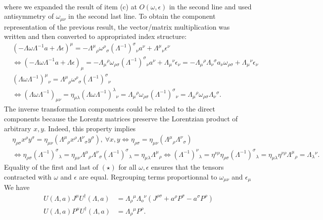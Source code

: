 \documentclass[10pt, a4paper]{article}
\begin{document}
\begin{enumerate}
\begin{align*}
  \end{align*}
  where we expanded the result of item (c) at $O(\omega, \epsilon)$ in the second line and used antisymmetry of $\omega_{\mu\nu}$ in the second last line. To obtain the component representation of the previous result, the vector/matrix multiplication was written and then converted to appropriated index structure:
  \begin{align*}
    &(-\Lambda\omega \Lambda^{-1} a + \Lambda \epsilon)^\mu = -\Lambda^{\mu}{}_{\rho} \omega^{\rho}{}_{\sigma}  (\Lambda^{-1})^{\sigma}{}_{\nu} a^{\nu} + \Lambda^{\mu}{}_{\nu} \epsilon^{\nu}\\ &\iff (-\Lambda\omega \Lambda^{-1} a + \Lambda \epsilon)_\mu = -\Lambda_{\mu}{}^{\rho} \omega_{\rho\sigma}  (\Lambda^{-1})^{\sigma}{}_{\nu} a^{\nu} + \Lambda_{\mu}{}^{\nu} \epsilon_{\nu} =  -\Lambda_{\mu}{}^{\rho} \Lambda_{\nu}{}^{\sigma} a_{\nu} \omega_{\rho\sigma} + \Lambda_{\mu}{}^{\nu} \epsilon_{\nu}\\
    &(\Lambda \omega \Lambda^{-1})^{\mu}{}_{\nu} = \Lambda^{\mu}{}_{\rho}  \omega^{\rho}{}_{\sigma}  (\Lambda^{-1})^{\sigma}{}_{\nu}\\
    &\iff (\Lambda \omega \Lambda^{-1})_{\mu\nu} = \eta_{\mu\lambda} (\Lambda \omega \Lambda^{-1})^{\lambda}{}_{\nu} = \Lambda_{\mu}{}^{\rho}  \omega_{\rho\sigma}  (\Lambda^{-1})^{\sigma}{}_{\nu} = \Lambda_{\mu}{}^{\rho}  \omega_{\rho\sigma} \Lambda_{\nu}{}^{\sigma}.
  \end{align*}
  The inverse transformation components could be related to the direct components because the Lorentz matrices preserve the Lorentzian product of arbitrary $x, y$. Indeed, this property implies 
  \begin{align*}
    &\eta_{\rho \sigma} x^{\rho} y^{\sigma}= \eta_{\mu \nu}(\Lambda^{\mu}{}_{\rho} x^\rho  \Lambda^{\nu}{}_{\sigma} y^{\sigma}), \ \forall x, y \iff \eta_{\rho \sigma}= \eta_{\mu \nu}(\Lambda^{\mu}{}_{\rho} \Lambda^{\nu}{}_{\sigma}) \\
    &\iff \eta_{\rho \sigma} (\Lambda^{-1})^{\sigma}{}_{\lambda}= \eta_{\mu \nu} \Lambda^{\mu}{}_{\rho} \Lambda^{\nu}{}_{\sigma} (\Lambda^{-1})^{\sigma}{}_{\lambda} = \eta_{\mu \lambda} \Lambda^{\mu}{}_{\rho}
    \iff (\Lambda^{-1})^{\nu}{}_{\lambda} = \eta^{\nu \rho}\eta_{\rho \sigma} (\Lambda^{-1})^{\sigma}{}_{\lambda}= \eta_{\mu \lambda} \eta^{\nu \rho} \Lambda^{\mu}{}_{\rho} = \Lambda_{\lambda}{}^{\nu}.
  \end{align*}
  Equality of the first and last of $(\star)$ for all $\omega, \epsilon$ ensures that the tensors contracted with $\omega$ and $\epsilon$ are equal. Regrouping terms proportionnal to $\omega_{\mu\nu}$ and $\epsilon_\mu$ We have 
  \begin{align*}
   U(\Lambda, a) J^\mu U^{\dagger}(\Lambda, a) & =\Lambda_\rho{ }^\mu \Lambda_o{ }^\nu\left(J^{\rho \sigma}+a^\rho P^\sigma-a^\sigma P^\rho\right) \\ U(\Lambda, a) P^\mu U^{\dagger}(\Lambda, a) & =\Lambda_\rho{ }^\mu P^\rho .
  \end{align*}


\end{enumerate}
\end{document}
